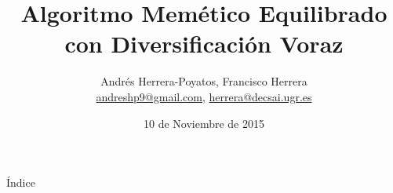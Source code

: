\documentclass[compress]{beamer}
\title{Algoritmo Memético Equilibrado \\ con Diversificación Voraz}
\author[Andrés Herrera-Poyatos, Francisco Herrera]{
	Andrés Herrera-Poyatos, Francisco Herrera \texorpdfstring{\\
		\href{mailto:andreshp9@gmail.com}{andreshp9@gmail.com}, \href{mailto:herrera@decsai.ugr.es}{herrera@decsai.ugr.es}
	}{}
}
\date{10 de Noviembre de 2015}
\newcommand{\importsection}[1]{}           %
\begin{document}
	\begin{frame}[plain]
		\titlepage
	\end{frame}

	\importsection{Motivation.tex}

	\begin{frame}{Índice}
		\hypertarget{index}{}
		\tableofcontents
	\end{frame}
	
	\importsection{AGEDV.tex}

	\importsection{MemeticAlgorithms.tex}

	\importsection{AMEDV.tex}

	\importsection{ExperimentalAnalysis.tex}

	\importsection{Conclusion.tex}
	
\end{document}
